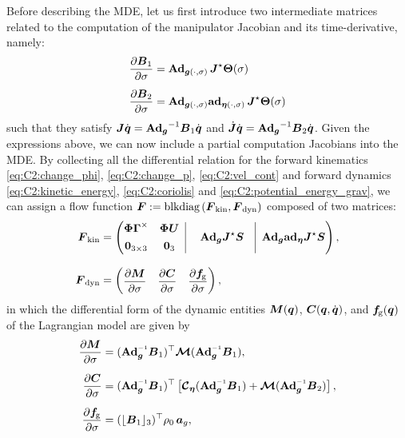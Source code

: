 Before describing the MDE, let us first introduce two intermediate matrices related to the computation of the manipulator Jacobian and its time-derivative, namely:
%
\begin{align}
\frac{\partial \boldsymbol{B}_1}{\partial \sigma} &= \textbf{Ad}_{{\boldsymbol{g}}(\cdot,\sigma)}\, \boldsymbol{J}^\star \boldsymbol{\Theta}(\sigma) \\[0.5em]
\frac{\partial \boldsymbol{B}_2}{\partial \sigma} &= \textbf{Ad}_{{\boldsymbol{g}}(\cdot,\sigma)}\textbf{ad}_{{\boldsymbol{\eta}}(\cdot,\sigma)}\, \boldsymbol{J}^\star {\boldsymbol{\Theta}}(\sigma)
\end{align}
%
such that they satisfy $\boldsymbol{J} {\dot{\boldsymbol{q}}} = {\textbf{Ad}_{\boldsymbol{g}}}^{-1} \boldsymbol{B}_1 {\dot{\boldsymbol{q}}}$ and $\,\dot{\!\boldsymbol{J}} {\dot{\boldsymbol{q}}} = {\textbf{Ad}_{\boldsymbol{g}}}^{-1} \boldsymbol{B}_2 {\dot{\boldsymbol{q}}}$.
Given the expressions above, we can now include a partial computation Jacobians into the MDE. By collecting all the differential relation for the forward kinematics \eqref{eq:C2:change_phi}, \eqref{eq:C2:change_p}, \eqref{eq:C2:vel_cont} and forward dynamics \eqref{eq:C2:kinetic_energy}, \eqref{eq:C2:coriolis} and
\eqref{eq:C2:potential_energy_grav}, we can assign a flow function
$\boldsymbol{F}:= \text{blkdiag}\left(\boldsymbol{F}_\textrm{kin},\boldsymbol{F}_\textrm{dyn} \right)$
composed of two matrices:
%
\begin{align}
\mat{F}_\textrm{kin} & = \begin{pmatrix}
\begin{matrix} \PhiB \vec{\Gamma}^\times & \PhiB \vec{U} \\[0.35em] \vec{0}_{3\times3} & \vec{0}_3 \end{matrix}
\;\; \vrule\; & \Ad_{\gB} \JB^\star\mat{S} &\vrule\;\; \Ad_{\gB} \ad_{\etaB} \JB^\star \mat{S}
\end{pmatrix}, \\[0.75em]
\mat{F}_\textrm{dyn} & = \begin{pmatrix}
\dfrac{\p \mat{M}}{\p \sigma} & \dfrac{\p \mat{C}}{\p \sigma} & \dfrac{\p \vec{f}\!\grav}{\p \sigma} \end{pmatrix},
\end{align}
in which the differential form of the dynamic entities $\boldsymbol{M}({\boldsymbol{q}})$, $\boldsymbol{C}({\boldsymbol{q}},{\dot{\boldsymbol{q}}})$, and $\boldsymbol{f}\!_{\scriptstyle\textrm{g}}({\boldsymbol{q}})$ of the Lagrangian model are given by
%
\begin{align}
\dfrac{\p \mat{M}}{\p \sigma} & = (\Ad_{\gB}\inv \mat{B}_1)^\top \ten{M} (\Ad_{\gB}\inv \mat{B}_1), \\[0.6em]
\dfrac{\p \mat{C}}{\p \sigma} & = (\Ad_{\gB}\inv \mat{B}_1)^\top \left[\ten{C}_\etaB (\Ad_{\gB}\inv \mat{B}_1) + \ten{M} (\Ad_{\gB}\inv \mat{B}_2) \right], \\[0.6em]
\dfrac{\p \vec{f}\!\grav}{\p \sigma} & = (\floor{\mat{B}_{1}}_3)^\top \rho_0\, \vec{a}_g,
\end{align}

